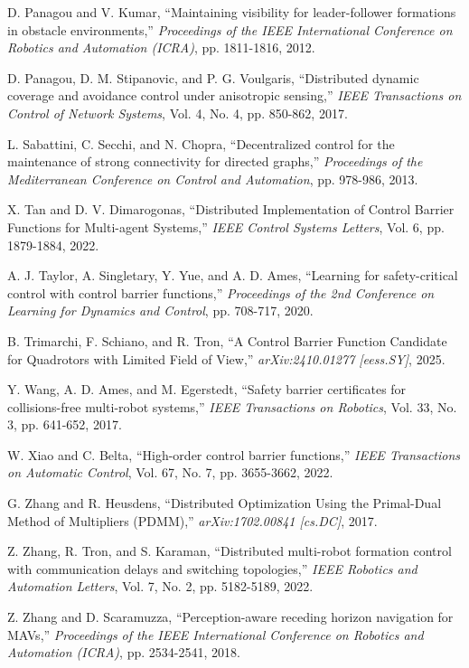 \begin{thebibliography}{99}
 D. Panagou and V. Kumar, ``Maintaining visibility for leader-follower formations in obstacle environments,'' {\it Proceedings of the IEEE International Conference on Robotics and Automation (ICRA)}, pp. 1811-1816, 2012.

 D. Panagou, D. M. Stipanovic, and P. G. Voulgaris, ``Distributed dynamic coverage and avoidance control under anisotropic sensing,'' {\it IEEE Transactions on Control of Network Systems}, Vol. 4, No. 4, pp. 850-862, 2017.

 L. Sabattini, C. Secchi, and N. Chopra, ``Decentralized control for the maintenance of strong connectivity for directed graphs,'' {\it Proceedings of the Mediterranean Conference on Control and Automation}, pp. 978-986, 2013.

 X. Tan and D. V. Dimarogonas, ``Distributed Implementation of Control Barrier Functions for Multi-agent Systems,'' {\it IEEE Control Systems Letters}, Vol. 6, pp. 1879-1884, 2022.

 A. J. Taylor, A. Singletary, Y. Yue, and A. D. Ames, ``Learning for safety-critical control with control barrier functions,'' {\it Proceedings of the 2nd Conference on Learning for Dynamics and Control}, pp. 708-717, 2020.

 B. Trimarchi, F. Schiano, and R. Tron, ``A Control Barrier Function Candidate for Quadrotors with Limited Field of View,'' {\it arXiv:2410.01277 [eess.SY]}, 2025.

 Y. Wang, A. D. Ames, and M. Egerstedt, ``Safety barrier certificates for collisions-free multi-robot systems,'' {\it IEEE Transactions on Robotics}, Vol. 33, No. 3, pp. 641-652, 2017.

 W. Xiao and C. Belta, ``High-order control barrier functions,'' {\it IEEE Transactions on Automatic Control}, Vol. 67, No. 7, pp. 3655-3662, 2022.

 G. Zhang and R. Heusdens, ``Distributed Optimization Using the Primal-Dual Method of Multipliers (PDMM),'' {\it arXiv:1702.00841 [cs.DC]}, 2017.

 Z. Zhang, R. Tron, and S. Karaman, ``Distributed multi-robot formation control with communication delays and switching topologies,'' {\it IEEE Robotics and Automation Letters}, Vol. 7, No. 2, pp. 5182-5189, 2022.

 Z. Zhang and D. Scaramuzza, ``Perception-aware receding horizon navigation for MAVs,'' {\it Proceedings of the IEEE International Conference on Robotics and Automation (ICRA)}, pp. 2534-2541, 2018.
\end{thebibliography}
